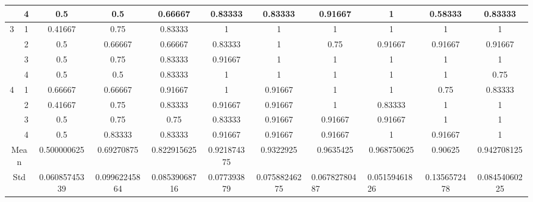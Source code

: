\documentclass[draft,dvipsnames]{drexel-thesis}
\begin{document}
\begin{thesis}
\begin{table}[!t]
{\begin{tabular}{|c|c|c|c|c|c|c|c|c|c|c|}
                      & 4                   & 0.5           & 0.5           & 0.66667       & 0.83333     & 0.83333       & 0.91667                            & 1                                  & 0.58333      & 0.83333       \\ \hline
\multirow{4}{*}{3}    & 1                   & 0.41667       & 0.75          & 0.83333       & 1           & 1             & 1                                  & 1                                  & 1            & 1             \\ \cline{2-11}
                      & 2                   & 0.5           & 0.66667       & 0.66667       & 0.83333     & 1             & 0.75                               & 0.91667                            & 0.91667      & 0.91667       \\ \cline{2-11}
                      & 3                   & 0.5           & 0.75          & 0.83333       & 0.91667     & 1             & 1                                  & 1                                  & 1            & 1             \\ \cline{2-11}
                      & 4                   & 0.5           & 0.5           & 0.83333       & 1           & 1             & 1                                  & 1                                  & 1            & 0.75          \\ \hline
\multirow{4}{*}{4}    & 1                   & 0.66667       & 0.66667       & 0.91667       & 1           & 0.91667       & 1                                  & 1                                  & 0.75         & 0.83333       \\ \cline{2-11}
                      & 2                   & 0.41667       & 0.75          & 0.83333       & 0.91667     & 0.91667       & 1                                  & 0.83333                            & 1            & 1             \\ \cline{2-11}
                      & 3                   & 0.5           & 0.75          & 0.75          & 0.83333     & 0.91667       & 0.91667                            & 0.91667                            & 1            & 1             \\ \cline{2-11}
                      & 4                   & 0.5           & 0.83333       & 0.83333       & 0.91667     & 0.91667       & 0.91667                            & 1                                  & 0.91667      & 1             \\ \hline
\multicolumn{2}{|c|}{Mean}                  & 0.500000625   & 0.69270875    & 0.822915625   & 0.921874375 & 0.9322925     & 0.9635425                          & 0.968750625                        & 0.90625      & 0.942708125   \\ \hline
\multicolumn{2}{|c|}{Std}                   & 0.06085745339 & 0.09962245864 & 0.08539068716 & 0.077393879 & 0.07588246275 & \multicolumn{1}{l|}{0.06782780487} & \multicolumn{1}{l|}{0.05159461826} & 0.1356572478 & 0.08454060225 \\ \hline
\end{tabular}}
\end{table}


\end{thesis}
\end{document}
